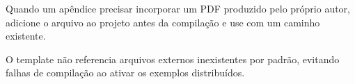 \label{ap:documento-externo}

Quando um apêndice precisar incorporar um PDF produzido pelo próprio autor, adicione o arquivo ao projeto antes da compilação e use \texttt{\string} com um caminho existente.

O template não referencia arquivos externos inexistentes por padrão, evitando falhas de compilação ao ativar os exemplos distribuídos.
